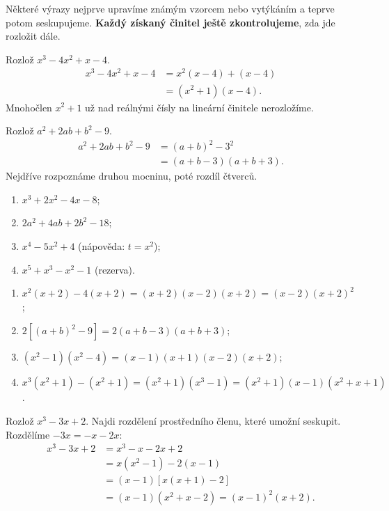 \documentclass[11pt,a4paper]{article}
\begin{document}
Některé výrazy nejprve upravíme známým vzorcem nebo vytýkáním a teprve potom seskupujeme. \textbf{Každý získaný činitel ještě zkontrolujeme}, zda jde rozložit dále.
\begin{prikladReseniBox}[breakable=false,title={Příklad 3}]
Rozlož $x^3-4x^2+x-4$.
\tcblower
\begin{align*}
x^3-4x^2+x-4&=x^2(x-4)+(x-4)\\
&=(x^2+1)(x-4).
\end{align*}
Mnohočlen $x^2+1$ už nad reálnými čísly na lineární činitele nerozložíme.
\end{prikladReseniBox}
\begin{prikladReseniBox}[breakable=false,title={Příklad 4}]
Rozlož $a^2+2ab+b^2-9$.
\tcblower
\begin{align*}
a^2+2ab+b^2-9&=(a+b)^2-3^2\\
&=(a+b-3)(a+b+3).
\end{align*}
Nejdříve rozpoznáme druhou mocninu, poté rozdíl čtverců.
\end{prikladReseniBox}
\begin{zadaniReseniBox}[breakable=false,title={Samostatná práce 2}]
\begin{enumerate}[label=\alph*)]
\item $x^3+2x^2-4x-8$;
\item $2a^2+4ab+2b^2-18$;
\item $x^4-5x^2+4$ (nápověda: $t=x^2$);
\item $x^5+x^3-x^2-1$ (rezerva).
\end{enumerate}
\tcblower
\begin{enumerate}[label=\alph*)]
\item $x^2(x+2)-4(x+2)=(x+2)(x-2)(x+2)=(x-2)(x+2)^2$;
\item $2[(a+b)^2-9]=2(a+b-3)(a+b+3)$;
\item $(x^2-1)(x^2-4)=(x-1)(x+1)(x-2)(x+2)$;
\item $x^3(x^2+1)-(x^2+1)=(x^2+1)(x^3-1)=(x^2+1)(x-1)(x^2+x+1)$.
\end{enumerate}
\end{zadaniReseniBox}
\begin{zadaniReseniBox}[breakable=false,title={Rozšíření 1}]
Rozlož $x^3-3x+2$. Najdi rozdělení prostředního členu, které umožní seskupit.
\tcblower
Rozdělíme $-3x=-x-2x$:
\begin{align*}
x^3-3x+2&=x^3-x-2x+2\\
&=x(x^2-1)-2(x-1)\\
&=(x-1)[x(x+1)-2]\\
&=(x-1)(x^2+x-2)=(x-1)^2(x+2).
\end{align*}
\end{zadaniReseniBox}
\end{document}
